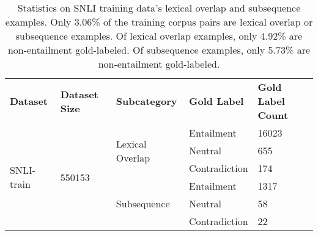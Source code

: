 \documentclass[11pt,a4paper]{article}
\begin{document}
\begin{table}[hbt!]
\begin{center}
\tiny
\begin{tabular}
{p{} p{} | p{} p{} p{} }
  \hline
   {\tiny \textbf{Dataset}} & \textbf{Dataset Size} & {\tiny \textbf{Subcategory}} & {\tiny \textbf{Gold Label}} & {\tiny \textbf{Gold Label Count}} \\

  \multirow{6}{*}{\tiny SNLI-train} & \multirow{6}{*}{550153} & \multirow{3}{*}{\tiny Lexical Overlap} & {\tiny Entailment} & {\tiny 16023} \\
  & & & {\tiny Neutral} & {\tiny 655} \\
  & & & {\tiny Contradiction} & {\tiny 174}  \\
  \cline{3-5}
  & & \multirow{3}{*}{\tiny Subsequence} & {\tiny Entailment} & {\tiny 1317} \\
  & & & {\tiny Neutral} & {\tiny 58} \\
  & & & {\tiny Contradiction} & {\tiny 22} \\
\end{tabular}
\end{center}
\caption{Statistics on SNLI training data's lexical overlap and subsequence examples. Only 3.06\% of the training corpus pairs are lexical overlap or subsequence examples. Of lexical overlap examples, only 4.92\% are non-entailment gold-labeled. Of subsequence examples, only 5.73\% are non-entailment gold-labeled.}
\end{table}
\end{document}
